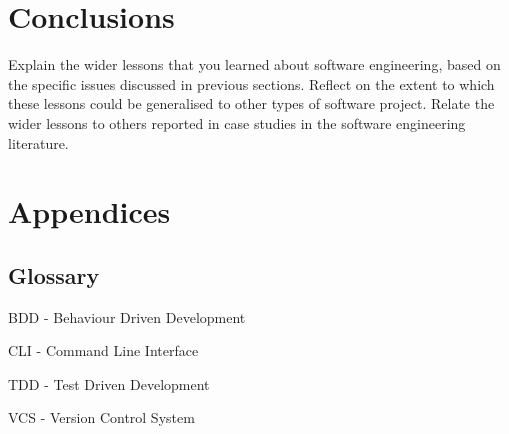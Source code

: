 \documentclass{l3proj}
\begin{document}
\section{Conclusions}
\label{sec:conclusion}

Explain the wider lessons that you learned about software engineering,
based on the specific issues discussed in previous sections.  Reflect
on the extent to which these lessons could be generalised to other
types of software project.  Relate the wider lessons to others
reported in case studies in the software engineering literature.

\newpage
\section{Appendices}
\label{sec:appendices}

\subsection{Glossary}
\label{subsec:appendices:glossary}
BDD - Behaviour Driven Development

CLI - Command Line Interface

TDD - Test Driven Development

VCS - Version Control System



\end{document}
